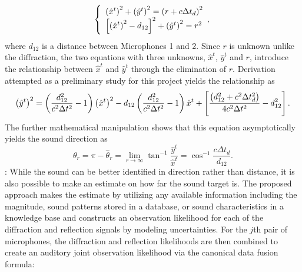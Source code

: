 \documentclass[letterpaper, 10 pt, conference]{ieeeconf}  %
\begin{document}
\begin{equation}\label{eq:reflection}
\left\{
\begin{array}{ll}
\left ( \hat x^t \right )^2 + \left ( \hat y^t \right )^2 = \left ( r + c \Delta t_d \right )^2\\
\left [ \left ( \hat x^t \right )^2 - d_{12} \right ]^2 + \left ( \hat y^t \right )^2 = r^2
\end{array},
\right.
\end{equation}
where $d_{12}$ is a distance between Microphones 1 and 2.  Since $r$ is unknown unlike the diffraction, the two equations with three unknowns, $\hat x^t$, $\hat y^t$ and $r$, introduce the relationship between $\hat x^t$ and $\hat y^t$ through the elimination of $r$.  Derivation attempted as a preliminary study for this project yields the relationship as
\begin{equation}\label{eq:estimation_reflection}
\left ( \hat y^t \right )^2 = \left ( \frac{d_{12}^2}{c^2 \Delta t^2} - 1 \right ) \left ( \hat x^t \right )^2 - d_{12} \left ( \frac{d_{12}^2}{c^2 \Delta t^2} - 1 \right ) \hat x^t + \left [ \frac{\left ( d_{12}^2 + c^2 \Delta t_d^2 \right )}{4 c^2 \Delta t^2} - d_{12}^2 \right ].  
\end{equation}
The further mathematical manipulation shows that this equation asymptotically yields the sound direction as 
\begin{equation}\label{eq:dirction_reflection}
\theta_r = \pi - \hat \theta_r = \lim_{r \rightarrow \infty} \tan^{-1} \frac{\hat y^t}{\hat x^t}= \cos^{-1} \frac{c \Delta t_d}{d_{12}}.   
\end{equation}
: 
While the sound can be better identified in direction rather than distance, it is also possible to make an estimate on how far the sound target is.  The proposed approach makes the estimate by utilizing any available information including the magnitude, sound patterns stored in a database, or sound characteristics in a knowledge base and constructs an observation likelihood for each of the diffraction and reflection signals by modeling uncertainties.  For the $j$th pair of microphones, the diffraction and reflection likelihoods are then combined to create an auditory joint observation likelihood via the canonical data fusion formula: 
\end{document}
